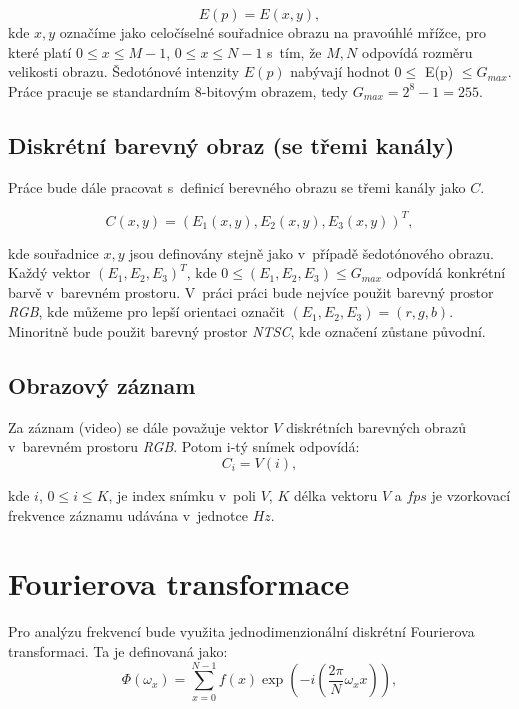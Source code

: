 \documentclass[
  digital, %
  table,   %
%
  lof,     %
  lot,     %
]{fithesis3}
\begin{document}
\begin{equation}
  E(p) = E(x,y),
\end{equation}
kde $x,y$ označíme jako celočíselné souřadnice obrazu na pravoúhlé mřížce, pro které platí $0 \leq x \leq M-1$, $0 \leq x \leq N-1$ s~tím, že $M, N$ odpovídá rozměru velikosti obrazu. Šedotónové intenzity $E(p)$ nabývají hodnot $0 \leq $ E(p) $ \leq G_{max}$. Práce pracuje se standardním 8-bitovým obrazem, tedy  $G_{max} = 2^8 - 1 = 255$.

\subsection {Diskrétní barevný obraz (se třemi kanály)}
Práce bude dále pracovat s~definicí berevného obrazu se třemi kanály jako $C$.

\begin{equation}
  C(x,y) = (E_1(x,y), E_2(x,y), E_3(x,y))^T,
\end{equation}

kde souřadnice $x,y$ jsou definovány stejně jako v~případě šedotónového obrazu. Každý vektor $(E_1, E_2, E_3)^T$, kde $0 \leq (E_1, E_2, E_3) \leq G_{max}$ odpovídá konkrétní barvě v~barevném prostoru. V~práci práci bude nejvíce použit barevný prostor \emph{RGB}, kde můžeme pro lepší orientaci označit $(E_1, E_2, E_3) = (r,g,b)$. Minoritně bude použit barevný prostor \emph{NTSC}, kde označení zůstane původní. 

\subsection{Obrazový záznam}
Za záznam (video) se dále považuje vektor $V$ diskrétních barevných obrazů v~barevném prostoru \emph{RGB}. Potom i-tý snímek odpovídá: 
\begin{equation}
  C_i = V(i),
\label{def:video}
\end{equation}

kde $i$, $0 \leq i \leq K$, je index snímku v~poli $V$, $K$ délka vektoru $V$ a $fps$ je vzorkovací frekvence záznamu udávána v~jednotce $Hz$.

        
\section{Fourierova transformace}
Pro analýzu frekvencí bude využita jednodimenzionální diskrétní Fourierova transformaci. Ta je definovaná jako:
\begin{equation}
    \Phi(\omega_x)= \sum_{x=0}^{N-1} f(x)\exp{(-i(\frac{2\pi}{N}\omega_xx))},
  \label{fourier-equation}
\end{equation}
 
\end{document}
